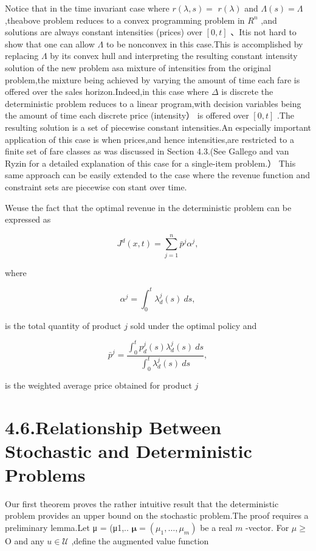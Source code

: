 Notice that in the time invariant case where \(r ( \lambda , s ) =\)
\(r ( \lambda )\) and \(\Lambda ( s ) = \Lambda\) ,theabove problem
reduces to a convex programming problem in \(R ^ { n }\) ,and solutions
are always constant intensities (prices) over \([ 0 , t ]\) 、Itis not
hard to show that one can allow \(\Lambda\) to be nonconvex in this
case.This is accomplished by replacing \(\Lambda\) by its convex hull
and interpreting the resulting constant intensity solution of the new
problem asa mixture of intensities from the original problem,the mixture
being achieved by varying the amount of time each fare is offered over
the sales horizon.Indeed,in this case where \(\Delta\) is discrete the
deterministic problem reduces to a linear program,with decision
variables being the amount of time each discrete price (intensity） is
offered over \([ 0 , t ]\) .The resulting solution is a set of piecewise
constant intensities.An especially important application of this case is
when prices,and hence intensities,are restricted to a finite set of fare
classes as was discussed in Section 4.3.(See Gallego and van Ryzin for a
detailed explanation of this case for a single-item problem.） This same
approach can be easily extended to the case where the revenue function
and constraint sets are piecewise con stant over time.

Weuse the fact that the optimal revenue in the deterministic problem can
be expressed as

\[
J ^ { d } ( x , t ) = \sum _ { j = 1 } ^ { n } \bar { p } ^ { j } \alpha ^ { j } ,
\]

where

\[
\alpha ^ { j } = \int _ { 0 } ^ { t } \lambda _ { d } ^ { j } ( s ) ~ d s ,
\]

is the total quantity of product \(j\) sold under the optimal policy and

\[
\bar { p } ^ { j } = \frac { \int _ { 0 } ^ { t } p _ { d } ^ { j } ( s ) \lambda _ { d } ^ { j } ( s ) ~ d s } { \int _ { 0 } ^ { t } \lambda _ { d } ^ { j } ( s ) ~ d s } ,
\]

is the weighted average price obtained for product \(j\)

\section{4.6.Relationship Between Stochastic and Deterministic
Problems}\label{relationship-between-stochastic-and-deterministic-problems}

Our first theorem proves the rather intuitive result that the
deterministic problem provides an upper bound on the stochastic
problem.The proof requires a preliminary lemma.Let μ = (μ1,..
\(\pmb { \mu } = ( \mu _ { 1 } , \ldots , \mu _ { m } )\) be a real
\(m\) -vector. For \(\mu \geqslant\) O and any \(u \in \mathcal { U }\)
,define the augmented value function

